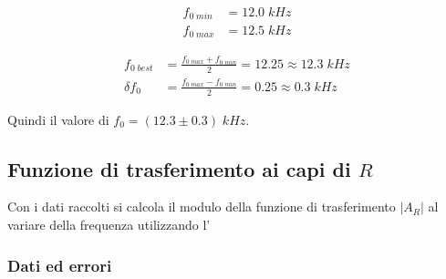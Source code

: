 \documentclass[11pt, a4paper]{article}
\numberwithin{equation}{section} %
\begin{document}

\begin{align*}
    f_{0 \; min} &= 12.0 \; kHz \\
    f_{0 \; max} &= 12.5 \; kHz
\end{align*}

\begin{align*}
    f_{0 \; best} &= \frac{f_{0 \; max} + f_{0 \; min}}{2} = 12.25 \approx 12.3 \; kHz \\
    \delta f_{0} &= \frac{f_{0 \; max} - f_{0 \; min}}{2} = 0.25 \approx 0.3 \; kHz
\end{align*}

Quindi il valore di \(f_{0} = (12.3 \pm 0.3) \; kHz\).

\newpage

\subsection{Funzione di trasferimento ai capi di $R$}

Con i dati raccolti si calcola il modulo della funzione di trasferimento $|A_{R}|$ al variare della frequenza utilizzando l' %

\subsubsection{Dati ed errori}

\end{document}
